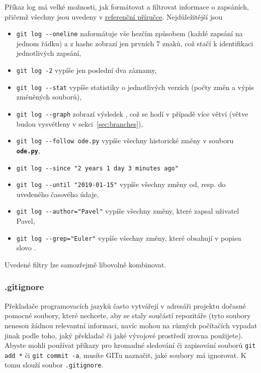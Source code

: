 \documentclass[a4paper,11pt,twoside]{article}
\def\code#1{\textnormal{\texttt{#1}}}
\def\file#1{\textnormal{\textbf{\texttt{#1}}}}
\theoremstyle{red}
\theoremstyle{green}
\begin{document}
    Příkaz log má velké možnosti, jak formátovat a filtrovat informace o zapsáních, přičemž všechny jsou uvedeny v \href{https://git-scm.com/docs/git-log}{referenční příručce}.
    Nejdůležitější jsou
    \begin{itemize}
        \item \code{git log -{}-oneline} naformátuje vše hezčím způsobem (každé zapsání na jednom řádku) a z hashe zobrazí jen prvních 7 znaků, což stačí k identifikaci jednotlivých zapsání,
        \item \code{git log -2} vypíše jen poslední dva záznamy,
        \item \code{git log -{}-stat} vypíše statistiky o jednotlivých verzích (počty změn a výpis změněných souborů),
        \item \code{git log -{}-graph} zobrazí výsledek , což se hodí v případě více větví (větve budou vysvětleny v sekci~\ref{sec:branches}),
        \item \code{git log -{}-follow ode.py} vypíše všechny historické změny v souboru \file{ode.py},
        \item \code{git log -{}-since "2 years 1 day 3 minutes ago"} 
        \item \code{git log -{}-until "2019-01-15"} vypíše všechny změny od, resp. do uvedeného časového údaje,
        \item \code{git log -{}-author="Pavel"} vypíše všechny změny, které zapsal uživatel Pavel,
        \item \code{git log -{}-grep="Euler"} vypíše všechny změny, které obsahují v popisu slovo .
    \end{itemize}
    Uvedené filtry lze samozřejmě libovolně kombinovat.

\subsubsection{.gitignore}
\label{sec:gitignore}
    Překladače programovacích jazyků často vytvářejí v adresáři projektu dočasné pomocné soubory, které nechcete, aby se staly součástí repozitáře (tyto soubory nenesou žádnou relevantní informaci, navíc mohou na různých počítačích vypadat jinak podle toho, jaký překladač či jaké vývojové prostředí zrovna použijete).
    Abyste mohli používat příkazy pro hromadné sledování či zapisování souborů \code{git add *} či \code{git commit -a}, musíte GITu naznačit, jaké soubory má ignorovat.
    K tomu slouží soubor \code{.gitignore}.
    
\end{document}
